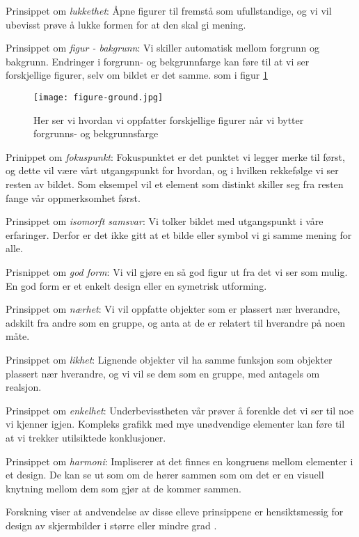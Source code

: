\noindent
Prinsippet om \emph{lukkethet}: Åpne figurer til fremstå som ufullstandige, og vi vil ubevisst prøve å lukke formen for at den skal gi mening.

\noindent
Prinsippet om \emph{figur - bakgrunn}: Vi skiller automatisk mellom forgrunn og bakgrunn. Endringer i forgrunn- og bekgrunnfarge kan føre til at vi ser forskjellige figurer, selv om bildet er det samme. som i figur \ref{forgrunn_bakgrunn}

\begin{figure}
\centering
\texttt{[image: figure-ground.jpg]}
\caption{Her ser vi hvordan vi oppfatter forskjellige figurer når vi bytter forgrunns- og bekgrunnsfarge}
\label{forgrunn_bakgrunn}
\end{figure}

\noindent
Prinippet om \emph{fokuspunkt}: Fokuspunktet er det punktet vi legger merke til først, og dette vil være vårt utgangspunkt for hvordan, og i hvilken rekkefølge vi ser resten av bildet. Som eksempel vil et element som distinkt skiller seg fra resten fange vår oppmerksomhet først.

\noindent
Prinsippet om \emph{isomorft samsvar}: Vi tolker bildet med utgangspunkt i våre erfaringer. Derfor er det ikke gitt at et bilde eller symbol vi gi samme mening for alle.

\noindent
Prisnippet om \emph{god form}: Vi vil gjøre en så god figur ut fra det vi ser som mulig. En god form er et enkelt design eller en symetrisk utforming.

\noindent
Prinsippet om \emph{nærhet}: Vi vil oppfatte objekter som er plassert nær hverandre, adskilt fra andre som en gruppe, og anta at de er relatert til hverandre på noen måte.

\noindent
Prinsippet om \emph{likhet}: Lignende objekter vil ha samme funksjon som objekter plassert nær hverandre, og vi vil se dem som en gruppe, med antagels om realsjon.

\noindent
Prinsippet om \emph{enkelhet}: Underbevisstheten vår prøver å forenkle det vi ser til noe vi kjenner igjen. Kompleks grafikk med mye unødvendige elementer kan føre til at vi trekker utilsiktede konklusjoner.

\noindent
Prinsippet om \emph{harmoni}: Impliserer at det finnes en kongruens mellom elementer i et design. De kan se ut som om de hører sammen som om det er en visuell knytning mellom dem som gjør at de kommer sammen.

\noindent
Forskning viser at andvendelse av disse elleve prinsippene er hensiktsmessig for design av skjermbilder i større eller mindre grad \cite{Chang02}.

